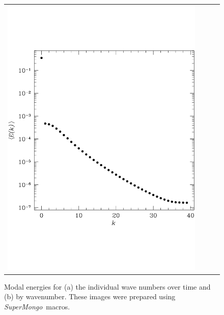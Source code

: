 \documentclass[11pt]{report}
\newcommand{\SM}{\emph{SuperMongo}}
\begin{document}
\begin{figure}
\begin{center}
\begin{tabular}{cccc}
    \includegraphics[height=0.25\textheight]{chan3modav}
    \end{tabular}
  \end{center}
 \caption{Modal energies for (a) the individual wave numbers over time
   and (b) by wavenumber.  These images were prepared using
   \SM\ macros.}
 \label{pic:modal_en}
\end{figure}
\end{document}
